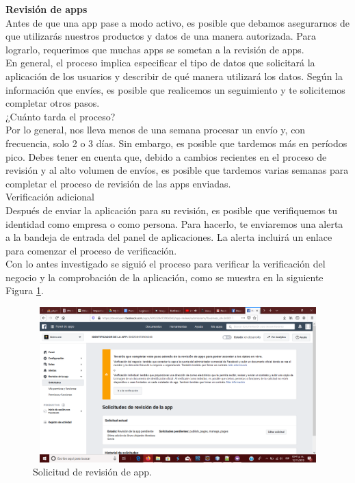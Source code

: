 	\textbf{Revisión de apps}\\ 
	
	\noindent Antes de que una app pase a modo activo, es posible que debamos asegurarnos de que
	utilizarás nuestros productos y datos de una manera autorizada. Para lograrlo, requerimos que
	muchas apps se sometan a la revisión de apps.\\
	\noindent En general, el proceso implica especificar el tipo de datos que solicitará la aplicación de
	los usuarios y describir de qué manera utilizará los datos. Según la información que envíes, es
	posible que realicemos un seguimiento y te solicitemos completar otros pasos.\\
	\newline
	¿Cuánto tarda el proceso?\\
	\noindent Por lo general, nos lleva menos de una semana procesar un envío y, con frecuencia, solo
	2 o 3 días. Sin embargo, es posible que tardemos más en períodos pico. Debes tener en cuenta
	que, debido a cambios recientes en el proceso de revisión y al alto volumen de envíos, es posible
	que tardemos varias semanas para completar el proceso de revisión de las apps enviadas.\\
	\newline
	Verificación adicional \\
	\noindent Después de enviar la aplicación para su revisión, es posible que verifiquemos tu	identidad como empresa o como persona. Para hacerlo, te enviaremos una alerta a la bandeja de
	entrada del panel de aplicaciones. La alerta incluirá un enlace para comenzar el proceso de	verificación.\\ %
	
	\noindent Con lo antes investigado se siguió el proceso para verificar la verificación del negocio y
	la comprobación de la aplicación, como se muestra en la siguiente Figura \ref{creacionFB}.
	\pagebreak
	
	\begin{figure}[hbt!]
		\centering
		\includegraphics[width=15cm, height=6cm]{Imagenes/FacebookAPI/Facebook1}
		\caption{Solicitud de revisión de app.}
		\label{creacionFB}
	\end{figure}

